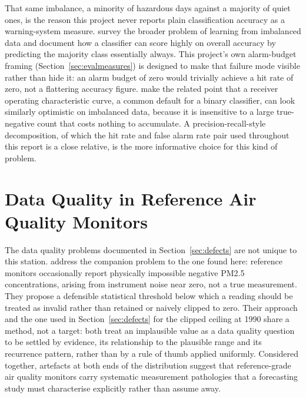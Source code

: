 \documentclass[12pt,a4paper]{report}
\begin{document}
That same imbalance, a minority of hazardous days against a majority of
quiet ones, is the reason this project never reports plain classification
accuracy as a warning-system measure. \citet{he2009imbalance} survey the
broader problem of learning from imbalanced data and document how a
classifier can score highly on overall accuracy by predicting the majority
class essentially always. This project's own alarm-budget framing
(Section~\ref{sec:evalmeasures}) is designed to make that failure mode
visible rather than hide it: an alarm budget of zero would trivially achieve
a hit rate of zero, not a flattering accuracy figure. \citet{saito2015prplot}
make the related point that a receiver operating characteristic curve, a
common default for a binary classifier, can look similarly optimistic on
imbalanced data, because it is insensitive to a large true-negative count
that costs nothing to accumulate. A precision-recall-style decomposition, of
which the hit rate and false alarm rate pair used throughout this report is
a close relative, is the more informative choice for this kind of problem.

\section{Data Quality in Reference Air Quality Monitors}

The data quality problems documented in Section~\ref{sec:defects} are not
unique to this station. \citet{jiang2023negative} address the companion
problem to the one found here: reference monitors occasionally report
physically impossible negative PM2.5 concentrations, arising from instrument
noise near zero, not a true measurement. They propose a defensible
statistical threshold below which a reading should be treated as invalid
rather than retained or naively clipped to zero. Their approach and the one
used in Section~\ref{sec:defects} for the clipped ceiling at 1990 share a
method, not a target: both treat an implausible value as a data quality
question to be settled by evidence, its relationship to the plausible range
and its recurrence pattern, rather than by a rule of thumb applied
uniformly. Considered together, artefacts at both ends of the distribution
suggest that reference-grade air quality monitors carry systematic
measurement pathologies that a forecasting study must characterise
explicitly rather than assume away.
\end{document}
